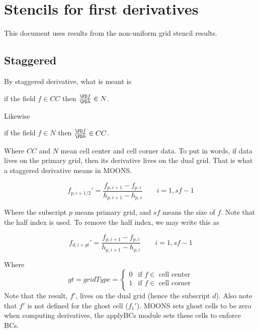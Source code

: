 \documentclass[11pt]{article}
\begin{document}
\doublespacing
\MOONSTITLE
\maketitle

\section{Stencils for first derivatives}
This document uses results from the non-uniform grid stencil results.

\subsection{Staggered}
By staggered derivative, what is meant is

if the field $f\in CC$ then $\frac{\PD f}{\PD h}\in N$.

Likewise

if the field $f\in N$ then $\frac{\PD f}{\PD h}\in CC$.

Where $CC$ and $N$ mean cell center and cell corner data. To put in words, if data lives on the primary grid, then its derivative lives on the dual grid. That is what a staggered derivative means in MOONS.

\begin{equation}
	f_{p,i+1/2}' = \frac{f_{p,i+1}-f_{p,i}}{h_{p,i+1}-h_{p,i}} \qquad i=1,sf-1
\end{equation}

Where the subscript $p$ means primary grid, and $sf$ means the size of $f$. Note that the half index is used. To remove the half index, we may write this as

\begin{equation}
	f_{d,i+gt}' = \frac{f_{p,i+1}-f_{p,i}}{h_{p,i+1}-h_{p,i}} \qquad i=1,sf-1
\end{equation}

Where
 \begin{equation}
   gt = gridType =
  \begin{cases}
      0 & \text{if $f \in $ cell center} \\
      1 & \text{if $f \in $ cell corner} \\
   \end{cases}
\end{equation}
Note that the result, $f'$, lives on the dual grid (hence the subscript $d$). Also note that $f'$ is not defined for the ghost cell ($f_1'$). MOONS sets ghost cells to be zero when computing derivatives, the applyBCs module sets these cells to enforce BCs.
\end{document}
